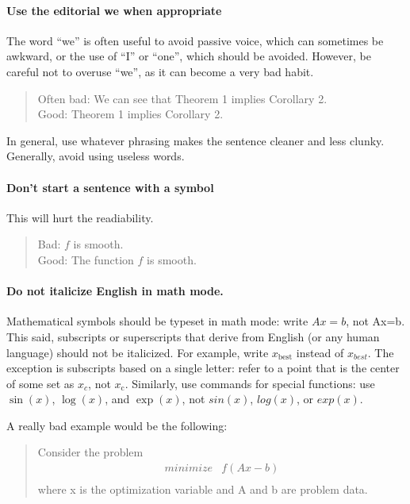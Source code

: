 \paragraph{Use the editorial we when appropriate}
The word “we” is often useful to avoid passive voice, which can sometimes be awkward, or the use of “I” or “one”, which should be avoided. However, be careful not to overuse “we”, as it can become a very bad habit.
\begin{quote}
Often bad: We can see that Theorem 1 implies Corollary 2.\\
Good: Theorem 1 implies Corollary 2.
\end{quote}
In general, use whatever phrasing makes the sentence cleaner and less clunky. Generally, avoid using useless words.

\paragraph{Don’t start a sentence with a symbol} This will hurt the readiability.
\begin{quote}
Bad: $f$ is smooth.\\
Good: The function $f$ is smooth.
\end{quote}

\paragraph{Do not italicize English in math mode.}
Mathematical symbols should be typeset in math mode:
write $Ax=b$, not Ax=b. This said, subscripts or
superscripts that derive from English (or any human language) should not be italicized. For example, write 
$x_{\text{best}}$ instead of $x_{best}$. The exception
is subscripts based on a single letter: refer
to a point that is the center of some set as $x_c$, not $x_{\mathrm{c}}$.
Similarly, use commands for special functions: use $\sin(x)$,
$\log(x)$, and $\exp(x)$, not $sin(x)$, $log(x)$, or $exp(x)$.

A really bad example would be the following:
\begin{quote}
Consider the problem
\[
\begin{array}{ll}
minimize & f(Ax - b) \\
\end{array}
\]
where x is the optimization variable and A and b are problem data.
\end{quote}



